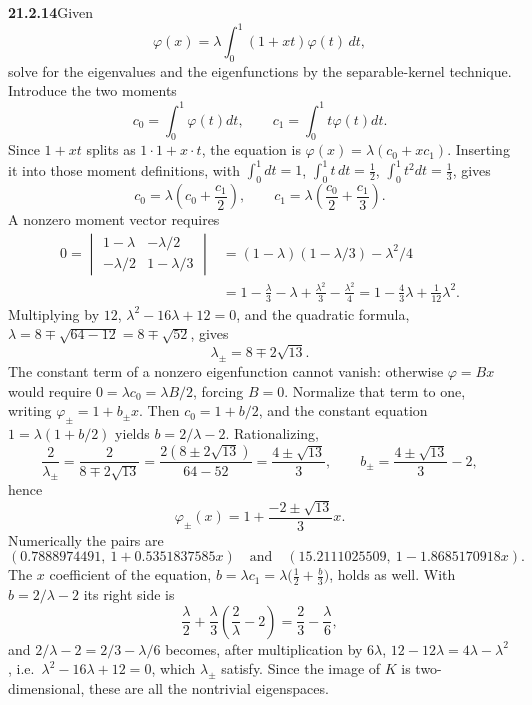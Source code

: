 \par\bigskip
\noindent\textbf{21.2.14}\quad Given
\[
\varphi(x)=\lambda\int_{0}^{1}(1+xt)\varphi(t)\,dt,
\]
solve for the eigenvalues and the eigenfunctions by the
separable-kernel technique.
\solution
Introduce the two moments
\[
c_0=\int_0^1\varphi(t)dt,\qquad
c_1=\int_0^1t\varphi(t)dt.
\]
Since $1+xt$ splits as $1\cdot1+x\cdot t$, the equation is
$\varphi(x)=\lambda(c_0+xc_1)$. Inserting it
into those moment definitions, with $\int_0^1dt=1$,
$\int_0^1t\,dt=\frac12$, $\int_0^1t^2dt=\frac13$, gives
\[
c_0=\lambda\left(c_0+\frac{c_1}{2}\right),\qquad
c_1=\lambda\left(\frac{c_0}{2}+\frac{c_1}{3}\right).
\]
A nonzero moment vector requires
\[
\begin{aligned}
0=\begin{vmatrix}1-\lambda&-\lambda/2\\
-\lambda/2&1-\lambda/3\end{vmatrix}
&=(1-\lambda)(1-\lambda/3)-\lambda^2/4\\
&=1-\frac\lambda3-\lambda+\frac{\lambda^2}3-\frac{\lambda^2}4
=1-\frac43\lambda+\frac1{12}\lambda^2.
\end{aligned}
\]
Multiplying by $12$, $\lambda^2-16\lambda+12=0$, and the quadratic
formula, $\lambda=8\mp\sqrt{64-12}=8\mp\sqrt{52}$, gives
\[
\boxed{\lambda_\pm=8\mp2\sqrt{13}}.
\]
The constant term of a nonzero eigenfunction cannot vanish: otherwise
$\varphi=Bx$ would require $0=\lambda c_0=\lambda B/2$, forcing $B=0$.
Normalize that term to one, writing $\varphi_\pm=1+b_\pm x$.
Then $c_0=1+b/2$, and the constant equation $1=\lambda(1+b/2)$ yields
$b=2/\lambda-2$. Rationalizing,
\[
\frac2{\lambda_\pm}=\frac{2}{8\mp2\sqrt{13}}
=\frac{2(8\pm2\sqrt{13})}{64-52}=\frac{4\pm\sqrt{13}}3,
\qquad b_\pm=\frac{4\pm\sqrt{13}}3-2,
\]
hence
\[
\boxed{\varphi_\pm(x)=1+\frac{-2\pm\sqrt{13}}3x}.
\]
Numerically the pairs are
\[
(0.7888974491,\ 1+0.5351837585x)\quad\text{and}\quad
(15.2111025509,\ 1-1.8685170918x).
\]
The $x$ coefficient of the equation,
$b=\lambda c_1=\lambda\bigl(\frac12+\frac b3\bigr)$, holds as well. With
$b=2/\lambda-2$ its right side is
\[
\frac\lambda2+\frac\lambda3\left(\frac2\lambda-2\right)
=\frac23-\frac\lambda6,
\]
and $2/\lambda-2=2/3-\lambda/6$ becomes, after multiplication by
$6\lambda$, $12-12\lambda=4\lambda-\lambda^2$, i.e.\
$\lambda^2-16\lambda+12=0$, which $\lambda_\pm$ satisfy. Since the image
of $K$ is two-dimensional, these are all the nontrivial eigenspaces.


